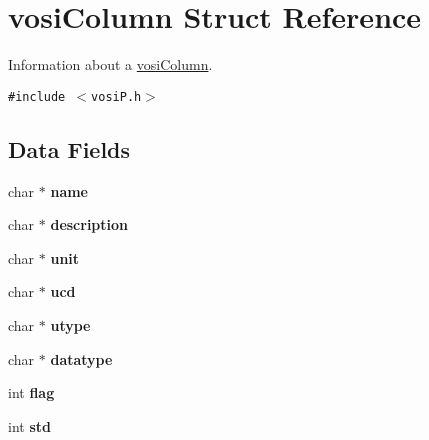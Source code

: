 \hypertarget{structvosiColumn}{
\section{vosiColumn Struct Reference}
\label{structvosiColumn}
}
Information about a \hyperlink{structvosiColumn}{vosiColumn}.  


{\tt \#include $<$vosiP.h$>$}

\subsection*{Data Fields}
\begin{CompactItemize}
\item 
\hypertarget{structvosiColumn_83164bd2cfa3279787dff02fb56eaa81}{
char $\ast$ \textbf{name}}
\label{structvosiColumn_83164bd2cfa3279787dff02fb56eaa81}

\item 
\hypertarget{structvosiColumn_cace0b0f25f0381c684ef8d8321f219c}{
char $\ast$ \textbf{description}}
\label{structvosiColumn_cace0b0f25f0381c684ef8d8321f219c}

\item 
\hypertarget{structvosiColumn_9223456072b7c519b1cbb00b5833008e}{
char $\ast$ \textbf{unit}}
\label{structvosiColumn_9223456072b7c519b1cbb00b5833008e}

\item 
\hypertarget{structvosiColumn_5f12b211bb8e9418036a709fff8ef7a9}{
char $\ast$ \textbf{ucd}}
\label{structvosiColumn_5f12b211bb8e9418036a709fff8ef7a9}

\item 
\hypertarget{structvosiColumn_31b0747a5b81dd908f74a55e5288a958}{
char $\ast$ \textbf{utype}}
\label{structvosiColumn_31b0747a5b81dd908f74a55e5288a958}

\item 
\hypertarget{structvosiColumn_dea1ce644f2769fcc899de57a5b00f93}{
char $\ast$ \textbf{datatype}}
\label{structvosiColumn_dea1ce644f2769fcc899de57a5b00f93}

\item 
\hypertarget{structvosiColumn_d3b61487b50ca60f612646501e7701e1}{
int \textbf{flag}}
\label{structvosiColumn_d3b61487b50ca60f612646501e7701e1}

\item 
\hypertarget{structvosiColumn_7db7120c5a6dbac1f2790cb8ed9ee4af}{
int \textbf{std}}
\label{structvosiColumn_7db7120c5a6dbac1f2790cb8ed9ee4af}


\end{CompactItemize}
